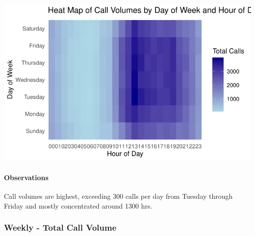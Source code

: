 \documentclass[
  letterpaper,
  DIV=11,
  numbers=noendperiod]{scrartcl}
\let\oldparagraph\paragraph
\renewcommand{\paragraph}[1]{\oldparagraph{#1}\mbox{}}
\begin{document}
\includegraphics{final_proj_group1_files/figure-pdf/day_vs_hour-1.pdf}

\paragraph{Observations}\label{observations-5}

Call volumes are highest, exceeding 300 calls per day from Tuesday
through Friday and mostly concentrated around 1300 hrs.

\subsubsection{Weekly - Total Call
Volume}\label{weekly---total-call-volume}
\end{document}
